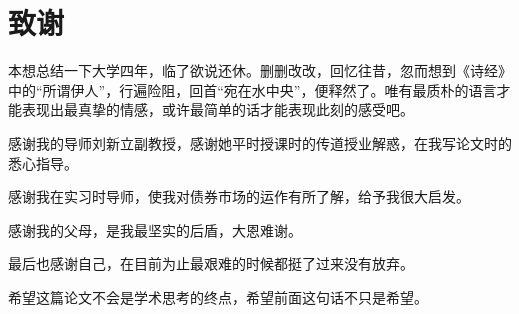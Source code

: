 \chapter{致谢}

本想总结一下大学四年，临了欲说还休。删删改改，回忆往昔，忽而想到《诗经》中的“所谓伊人”，行遍险阻，回首“宛在水中央”，便释然了。唯有最质朴的语言才能表现出最真挚的情感，或许最简单的话才能表现此刻的感受吧。

感谢我的导师刘新立副教授，感谢她平时授课时的传道授业解惑，在我写论文时的悉心指导。

感谢我在实习时导师，使我对债券市场的运作有所了解，给予我很大启发。

感谢我的父母，是我最坚实的后盾，大恩难谢。

最后也感谢自己，在目前为止最艰难的时候都挺了过来没有放弃。

希望这篇论文不会是学术思考的终点，希望前面这句话不只是希望。
